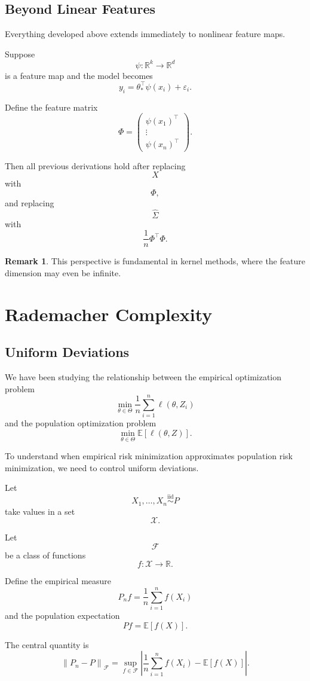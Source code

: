 \documentclass[12pt,oneside]{book}
\numberwithin{equation}{section}
\theoremstyle{definition}
\newtheorem{remark}{Remark}[section]
\theoremstyle{plain}
\theoremstyle{remark}
\newcommand{\R}{\mathbb{R}}
\newcommand{\E}{\mathbb{E}}
\newcommand{\iid}{\overset{\text{iid}}{\sim}}
\newcommand{\norm}[1]{\left\lVert #1 \right\rVert}
\begin{document}
\section{Beyond Linear Features}

Everything developed above extends immediately to nonlinear feature maps.

Suppose
\[
\psi:\R^k\to\R^d
\]
is a feature map and the model becomes
\[
y_i
=
\theta_*^\top\psi(x_i)+\varepsilon_i.
\]

Define the feature matrix
\[
\Phi
=
\begin{pmatrix}
\psi(x_1)^\top\\
\vdots\\
\psi(x_n)^\top
\end{pmatrix}.
\]

Then all previous derivations hold after replacing
\[
X
\]
with
\[
\Phi,
\]
and replacing
\[
\widehat{\Sigma}
\]
with
\[
\frac{1}{n}\Phi^\top\Phi.
\]

\begin{remark}
This perspective is fundamental in kernel methods, where the feature dimension may even be infinite.
\end{remark}

\chapter{Rademacher Complexity}

\section{Uniform Deviations}

We have been studying the relationship between the empirical optimization problem
\[
\min_{\theta\in\Theta}
\frac{1}{n}\sum_{i=1}^n \ell(\theta,Z_i)
\]
and the population optimization problem
\[
\min_{\theta\in\Theta}
\E[\ell(\theta,Z)].
\]

To understand when empirical risk minimization approximates population risk minimization, we need to control uniform deviations.

Let
\[
X_1,\dots,X_n\iid P
\]
take values in a set
\[
\mathcal{X}.
\]

Let
\[
\mathcal{F}
\]
be a class of functions
\[
f:\mathcal{X}\to\R.
\]

Define the empirical measure
\[
P_nf
=
\frac{1}{n}\sum_{i=1}^n f(X_i)
\]
and the population expectation
\[
Pf
=
\E[f(X)].
\]

The central quantity is
\[
\norm{P_n-P}_{\mathcal{F}}
=
\sup_{f\in\mathcal{F}}
\left|
\frac{1}{n}\sum_{i=1}^n f(X_i)
-
\E[f(X)]
\right|.
\]
\end{document}

